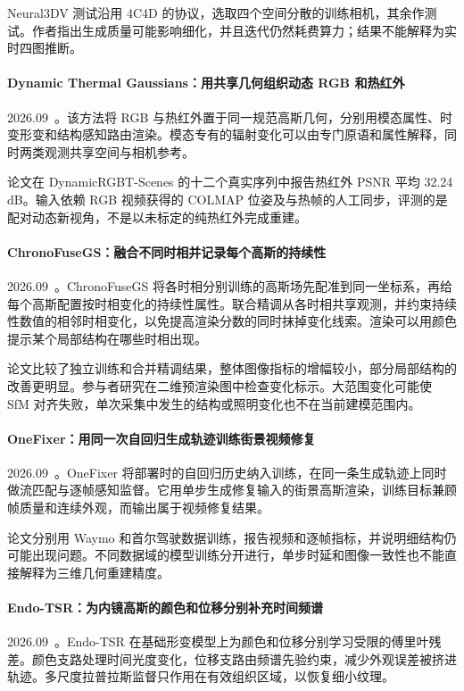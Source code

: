 Neural3DV 测试沿用 4C4D 的协议，选取四个空间分散的训练相机，其余作测试。作者指出生成质量可能影响细化，并且迭代仍然耗费算力；结果不能解释为实时四图推断。

\paragraph{Dynamic Thermal Gaussians：用共享几何组织动态 RGB 和热红外}
2026.09~\cite{2609_24531}。该方法将 RGB 与热红外置于同一规范高斯几何，分别用模态属性、时变形变和结构感知路由渲染。模态专有的辐射变化可以由专门原语和属性解释，同时两类观测共享空间与相机参考。

论文在 DynamicRGBT-Scenes 的十二个真实序列中报告热红外 PSNR 平均 32.24 dB。输入依赖 RGB 视频获得的 COLMAP 位姿及与热帧的人工同步，评测的是配对动态新视角，不是以未标定的纯热红外完成重建。

\paragraph{ChronoFuseGS：融合不同时相并记录每个高斯的持续性}
2026.09~\cite{2609_31339}。ChronoFuseGS 将各时相分别训练的高斯场先配准到同一坐标系，再给每个高斯配置按时相变化的持续性属性。联合精调从各时相共享观测，并约束持续性数值的相邻时相变化，以免提高渲染分数的同时抹掉变化线索。渲染可以用颜色提示某个局部结构在哪些时相出现。

论文比较了独立训练和合并精调结果，整体图像指标的增幅较小，部分局部结构的改善更明显。参与者研究在二维预渲染图中检查变化标示。大范围变化可能使 SfM 对齐失败，单次采集中发生的结构或照明变化也不在当前建模范围内。

\paragraph{OneFixer：用同一次自回归生成轨迹训练街景视频修复}
2026.09~\cite{2609_32175}。OneFixer 将部署时的自回归历史纳入训练，在同一条生成轨迹上同时做流匹配与逐帧感知监督。它用单步生成修复输入的街景高斯渲染，训练目标兼顾帧质量和连续外观，而输出属于视频修复结果。

论文分别用 Waymo 和首尔驾驶数据训练，报告视频和逐帧指标，并说明细结构仍可能出现问题。不同数据域的模型训练分开进行，单步时延和图像一致性也不能直接解释为三维几何重建精度。

\paragraph{Endo-TSR：为内镜高斯的颜色和位移分别补充时间频谱}
2026.09~\cite{2609_32399}。Endo-TSR 在基础形变模型上为颜色和位移分别学习受限的傅里叶残差。颜色支路处理时间光度变化，位移支路由频谱先验约束，减少外观误差被挤进轨迹。多尺度拉普拉斯监督只作用在有效组织区域，以恢复细小纹理。

